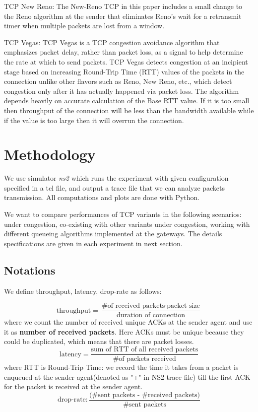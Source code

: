 \documentclass[10pt, conference]{IEEEtran/IEEEtran}
\begin{document}
TCP New Reno: The New-Reno TCP in this paper includes a small change to the Reno algorithm at the sender that eliminates Reno's wait for a retransmit timer when multiple packets are lost from a window. \cite{sim}

TCP Vegas: TCP Vegas is a TCP congestion avoidance algorithm that emphasizes packet delay, rather than packet loss, as a signal to help determine the rate at which to send packets. TCP Vegas detects congestion at an incipient stage based on increasing Round-Trip Time (RTT) values of the packets in the connection unlike other flavors such as Reno, New Reno, etc., which detect congestion only after it has actually happened via packet loss. The algorithm depends heavily on accurate calculation of the Base RTT value. If it is too small then throughput of the connection will be less than the bandwidth available while if the value is too large then it will overrun the connection.
%


\section{Methodology}

We use simulator \textit{ns2} which runs the experiment with given configuration specified in a tcl file, and
  output a trace file that we can analyze packets transmission. All computations and plots are done with Python.

We want to compare performances of TCP variants in the following scenarios: under congestion, co-existing with other variants under congestion, working with different queueing algorithms implemented at the gateways. The details specifications are given in each experiment in next section.
\subsection*{Notations}

We define throughput, latency, drop-rate as follows:

\[
\text{throughput}= \frac{\text{\# of received packets} \cdot \text{packet size}}{\text{duration of connection}}
\]
where we count the number of received unique ACKs at the sender agent and use it as \textbf{number of received packets}. Here ACKs must be unique because they could be duplicated, which means that there are packet losses.
\[
\text{latency}=\frac{\text{sum of RTT of all received packets} }{\text{\# of packets received}}
\]
where RTT is Round-Trip Time: we record the time it takes from a packet is enqueued at the sender agent(denoted as "+" in NS2 trace file) till the first ACK for the packet is received at the sender agent.
\[
\text{drop-rate}: \frac{\text{(\# sent packets - \# received packets)}}{\text{\# sent packets}}
\]
\end{document}
